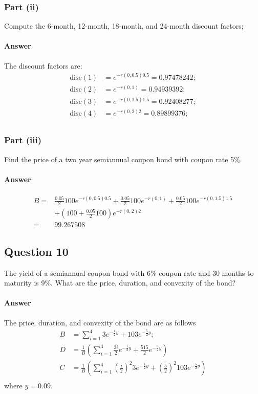 \subsubsection{Part (ii)}
Compute the 6-month, 12-month, 18-month, and 24-month discount factors;

\paragraph{Answer}
The discount factors are:
\begin{align*}
    \text{disc}(1) &= e^{-r(0, 0.5) 0.5} = 0.97478242; \\
    \text{disc}(2) &= e^{-r(0, 1)} = 0.94939392; \\
    \text{disc}(3) &= e^{-r(0, 1.5) 1.5} = 0.92408277; \\
    \text{disc}(4) &= e^{-r(0, 2) 2} = 0.89899376; \\
\end{align*}

\subsubsection{Part (iii)}
Find the price of a two year semiannual coupon bond with coupon rate 5\%.

\paragraph{Answer}
\begin{align*}
    B =& \frac{0.05}{2} 100 e^{-r(0, 0.5) 0.5} +
        \frac{0.05}{2} 100 e^{-r(0, 1)} +
        \frac{0.05}{2} 100 e^{-r(0, 1.5) 1.5} \\
       &+ \left( 100 + \frac{0.05}{2} 100 \right) e^{-r(0, 2) 2} \\
      =& 99.267508
\end{align*}

\subsection{Question 10}
The yield of a semiannual coupon bond with 6\% coupon rate and 30 months to
    maturity is 9\%.
What are the price, duration, and convexity of the bond?

\paragraph{Answer}
The price, duration, and convexity of the bond are as follows
\begin{align*}
    B &= \sum_{i=1}^{4} 3 e^{-\frac{i}{2} y} + 103 e^{-\frac{5}{2} y}; \\
    D &= \frac{1}{B} \left( \sum_{i=1}^{4} \frac{3 i}{2}
        e^{-\frac{i}{2} y} + \frac{515}{2} e^{-\frac{5}{2} y} \right) \\
    C &= \frac{1}{B} \left( \sum_{i=1}^{4} \left( \frac{i}{2} \right)^2 3
        e^{-\frac{i}{2} y} + \left( \frac{5}{2} \right)^2 103
        e^{-\frac{5}{2} y} \right) \\
\end{align*}
where $ y = 0.09 $.
